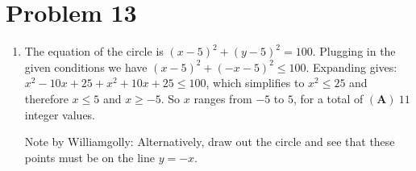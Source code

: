 \documentclass{article}%
\begin{document}
%
\section*{Problem 13}%
\label{sec:Problem13}%
\begin{enumerate}%
\item%
The equation of the circle is $(x-5)^2+(y-5)^2=100$. Plugging in the given conditions we have $(x-5)^2+(-x-5)^2 \leq 100$. Expanding gives: $x^2-10x+25+x^2+10x+25\leq 100$, which simplifies to
$x^2\leq 25$ and therefore
$x\leq 5$ and $x\geq -5$. So $x$ ranges from $-5$ to $5$, for a total of $\boxed{\mathbf{(A)}\ 11}$ integer values.

Note by Williamgolly:
Alternatively, draw out the circle and see that these points must be on the line $y=-x$.

%
\end{enumerate}

%
\end{document}
